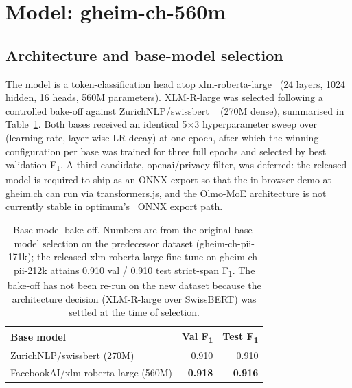 \documentclass[sigconf,nonacm]{acmart}
\begin{document}
\section{Model: gheim-ch-560m}
\label{sec:model}

\subsection{Architecture and base-model selection}

The model is a token-classification head atop
\textsf{xlm-roberta-large}~\cite{conneau2020unsupervised} (24 layers,
1024 hidden, 16 heads, 560M parameters). XLM-R-large was selected
following a controlled bake-off against \textsf{ZurichNLP/swissbert}
~\cite{vamvas2023swissbert} (270M dense), summarised in
Table~\ref{tab:bakeoff}. Both bases received an identical 5$\times$3
hyperparameter sweep over (learning rate, layer-wise LR decay) at
one epoch, after which the winning configuration per base was trained
for three full epochs and selected by best validation F\textsubscript{1}.
A third candidate, \textsf{openai/privacy-filter}, was deferred:
the released model is required to ship as an ONNX export so that
the in-browser demo at \href{https://gheim.ch}{gheim.ch} can run
via \textsf{transformers.js}, and the Olmo-MoE architecture is not
currently stable in \textsf{optimum}'s~\cite{onnxruntime} ONNX
export path.

\begin{table}[h]
\centering
\caption{Base-model bake-off. Numbers are from the original base-model
selection on the predecessor dataset (\textsf{gheim-ch-pii-171k}); the
released \textsf{xlm-roberta-large} fine-tune on
\textsf{gheim-ch-pii-212k} attains 0.910 val / 0.910 test
strict-span F\textsubscript{1}. The bake-off has not been re-run on
the new dataset because the architecture decision (XLM-R-large over
SwissBERT) was settled at the time of selection.}
\label{tab:bakeoff}
\small
\begin{tabular}{l r r}
\toprule
Base model                                  & Val F\textsubscript{1} & Test F\textsubscript{1} \\
\midrule
\textsf{ZurichNLP/swissbert} (270M)         & 0.910 & 0.910 \\
\textsf{FacebookAI/xlm-roberta-large} (560M)& \textbf{0.918} & \textbf{0.916} \\
\bottomrule
\end{tabular}
\end{table}
\end{document}
